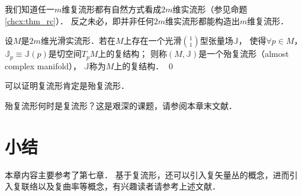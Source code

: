 我们知道任一$m$维复流形都有自然方式看成$2m$维实流形（参见命题\ref{chcx:thm_rc}）．
反之未必，即并非任何$2m$维实流形都能构造出$m$维复流形．


\begin{definition}\label{chcx:def_acm}
    设$M$是$2m$维光滑实流形．若在$M$上存在一个光滑$\binom{1}{1}$型张量场$\mathbb{J}$，
    使得$\forall p\in M$，$\mathbb{J}_p\equiv \mathbb{J}(p)$是切空间$T_p M$上的复结构；
    则称$(M,\mathbb{J})$是一个{\heiti 殆复流形}（almost complex manifold），
    $\mathbb{J}$称为$M$上的{\heiti 复结构}． \qed
\end{definition}

可以证明复流形肯定是殆复流形．

殆复流形何时是复流形？这是艰深的课题，请参阅本章末文献．




\section*{小结}
本章内容主要参考了\parencite{cc2001-zh}第七章． %
基于复流形，还可以引入复矢量丛的概念，进而引入复联络以及复曲率等概念，有兴趣读者请参考上述文献．


\endinput












